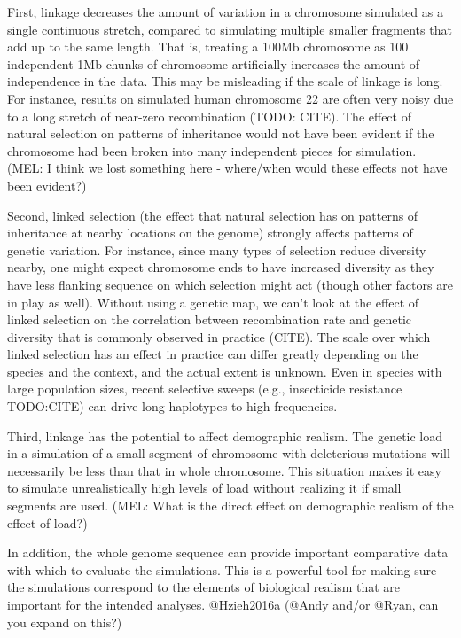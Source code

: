 \documentclass[hidelinks]{article}
\begin{document}
First, linkage decreases the amount of variation in a chromosome
simulated as a single continuous stretch, compared to simulating
multiple smaller fragments that add up to the same length. That is,
treating a 100Mb chromosome as 100 independent 1Mb chunks of chromosome
artificially increases the amount of independence in the data. This may
be misleading if the scale of linkage is long. For instance, results on
simulated human chromosome 22 are often very noisy due to a long stretch
of near-zero recombination (TODO: CITE). The effect of natural selection
on patterns of inheritance would not have been evident if the chromosome
had been broken into many independent pieces for simulation. (MEL: I
think we lost something here - where/when would these effects not have
been evident?)

Second, linked selection (the effect that natural selection has on
patterns of inheritance at nearby locations on the genome) strongly
affects patterns of genetic variation. For instance, since many types of
selection reduce diversity nearby, one might expect chromosome ends to
have increased diversity as they have less flanking sequence on which
selection might act (though other factors are in play as well). Without
using a genetic map, we can't look at the effect of linked selection on
the correlation between recombination rate and genetic diversity that is
commonly observed in practice (CITE). The scale over which linked
selection has an effect in practice can differ greatly depending on the
species and the context, and the actual extent is unknown. Even in
species with large population sizes, recent selective sweeps (e.g.,
insecticide resistance TODO:CITE) can drive long haplotypes to high
frequencies.

Third, linkage has the potential to affect demographic realism. The
genetic load in a simulation of a small segment of chromosome with
deleterious mutations will necessarily be less than that in whole
chromosome. This situation makes it easy to simulate unrealistically
high levels of load without realizing it if small segments are used.
(MEL: What is the direct effect on demographic realism of the effect of
load?)

In addition, the whole genome sequence can provide important comparative
data with which to evaluate the simulations. This is a powerful tool for
making sure the simulations correspond to the elements of biological
realism that are important for the intended analyses. @Hzieh2016a (@Andy
and/or @Ryan, can you expand on this?)
\end{document}

